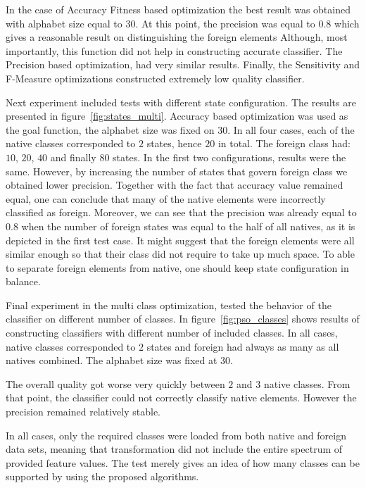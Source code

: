 \documentclass{mini}
\begin{document}
In the case of Accuracy Fitness based optimization the best result was obtained with alphabet size equal to $30$. At this point, the precision was equal to $0.8$ which gives a reasonable result on distinguishing the foreign elements Although, most importantly, this function did not help in constructing accurate classifier. The Precision based optimization, had very similar results. Finally, the Sensitivity and F-Measure optimizations constructed extremely low quality classifier.

Next experiment included tests with different state configuration. The results are presented in figure~\ref{fig:states_multi}. Accuracy based optimization was used as the goal function, the alphabet size was fixed on $30$. In all four cases, each of the native classes corresponded to $2$ states, hence $20$ in total. The foreign class had: $10$, $20$, $40$ and finally $80$ states. In the first two configurations, results were the same. However, by increasing the number of states that govern foreign class we obtained lower precision. Together with the fact that accuracy value remained equal, one can conclude that many of the native elements were incorrectly classified as foreign. Moreover, we can see that the precision was already equal to $0.8$ when the number of foreign states was equal to the half of all natives, as it is depicted in the first test case. It might suggest that the foreign elements were all similar enough so that their class did not require to take up much space. To able to separate foreign elements from native, one should keep state configuration in balance.

\makeFigureFitnessMulti

\makeFigureStateConfigurationMulti

\makeFigurePSOClasses

Final experiment in the multi class optimization, tested the behavior of the classifier on different number of classes. In figure~\ref{fig:pso_classes} shows results of constructing classifiers with different number of included classes. In all cases, native classes corresponded to $2$ states and foreign had always as many as all natives combined. The alphabet size was fixed at $30$.

The overall quality got worse very quickly between $2$ and $3$ native classes. From that point, the classifier could not correctly classify native elements. However the precision remained relatively stable.

In all cases, only the required classes were loaded from both native and foreign data sets, meaning that transformation did not include the entire spectrum of provided feature values. The test merely gives an idea of how many classes can be supported by using the proposed algorithms.
\end{document}
